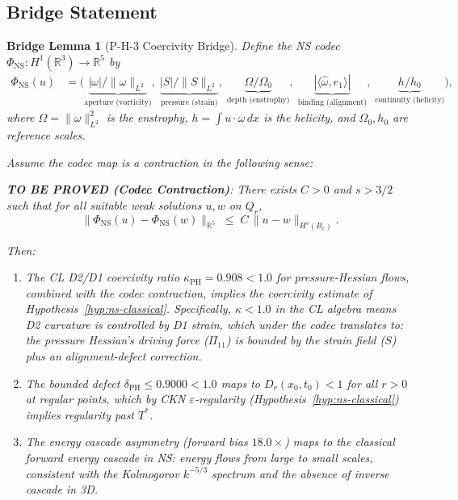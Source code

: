 \documentclass[11pt]{article}
\newtheorem{lemma}{Bridge Lemma}
\theoremstyle{definition}
\begin{document}
\subsection{Bridge Statement}

\begin{lemma}[P-H-3 Coercivity Bridge]
\label{lem:bridge-PH3}
Define the NS codec $\Phi_{\mathrm{NS}}: H^1(\mathbb{R}^3) \to \mathbb{R}^5$ by
\begin{align*}
  \Phi_{\mathrm{NS}}(u) &= \bigl(
    \underbrace{|\omega|/\|\omega\|_{L^2}}_{\text{aperture (vorticity)}},\;
    \underbrace{|S|/\|S\|_{L^2}}_{\text{pressure (strain)}},\;
    \underbrace{\Omega/\Omega_0}_{\text{depth (enstrophy)}},\;
    \underbrace{|\langle\hat{\omega}, e_1\rangle|}_{\text{binding (alignment)}},\;
    \underbrace{h/h_0}_{\text{continuity (helicity)}}
  \bigr),
\end{align*}
where $\Omega = \|\omega\|_{L^2}^2$ is the enstrophy, $h = \int u \cdot \omega\, dx$
is the helicity, and $\Omega_0, h_0$ are reference scales.

Assume the codec map is a contraction in the following sense:

\medskip
\noindent\textbf{TO BE PROVED (Codec Contraction)}:
\emph{There exists $C > 0$ and $s > 3/2$ such that for all suitable weak solutions
$u, w$ on $Q_r$,}
\[
  \bigl\| \Phi_{\mathrm{NS}}(u) - \Phi_{\mathrm{NS}}(w) \bigr\|_{\mathbb{R}^5}
  \;\leq\;
  C\, \|u - w\|_{H^s(B_r)}.
\]

Then:
\begin{enumerate}
  \item[\textbf{(i)}] The CL D2/D1 coercivity ratio $\kappa_{\mathrm{PH}} = 0.908 < 1.0$
    for pressure-Hessian flows, combined with the codec contraction, implies
    the coercivity estimate of Hypothesis~\ref{hyp:ns-classical}.
    Specifically, $\kappa < 1.0$ in the CL algebra means D2 curvature is controlled
    by D1 strain, which under the codec translates to:
    the pressure Hessian's driving force ($\Pi_{11}$) is bounded by
    the strain field ($S$) plus an alignment-defect correction.

  \item[\textbf{(ii)}] The bounded defect $\delta_{\mathrm{PH}} \leq 0.9000 < 1.0$ maps to
    $D_r(x_0, t_0) < 1$ for all $r > 0$ at regular points, which by
    CKN $\varepsilon$-regularity (Hypothesis~\ref{hyp:ns-classical})
    implies regularity past $T^*$.

  \item[\textbf{(iii)}] The energy cascade asymmetry (forward bias $18.0\times$)
    maps to the classical forward energy cascade in NS:
    energy flows from large to small scales, consistent with
    the Kolmogorov $k^{-5/3}$ spectrum and the absence of inverse cascade in 3D.
\end{enumerate}
\end{lemma}
\end{document}
